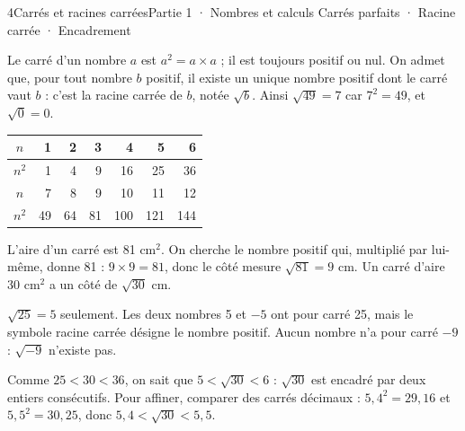 \begin{ouverture}[calcul]{4}{Carrés et racines carrées}{Partie 1 · Nombres et calculs}
{Carrés parfaits · Racine carrée · Encadrement}
\end{ouverture}
\pagestyle{otMain}\essentiel\fontsize{11}{15}\selectfont
{}\label{cours-4-1}
\begin{definition}Le carré d’un nombre $a$ est $a^2=a\times a$ ; il est toujours positif ou nul. On admet que, pour tout nombre $b$ positif, il existe un unique nombre positif dont le carré vaut $b$ : c’est la racine carrée de $b$, notée $\sqrt b$. Ainsi $\sqrt{49}=7$ car $7^2=49$, et $\sqrt0=0$.\end{definition}
\begin{center}\begin{tabular}{c|rrrrrr}\toprule
$n$ & 1 & 2 & 3 & 4 & 5 & 6\\\midrule
$n^2$ & 1 & 4 & 9 & 16 & 25 & 36\\\midrule
$n$ & 7 & 8 & 9 & 10 & 11 & 12\\\midrule
$n^2$ & 49 & 64 & 81 & 100 & 121 & 144\\\bottomrule
\end{tabular}\end{center}
\begin{exemple}L’aire d’un carré est 81 cm$^2$. On cherche le nombre positif qui, multiplié par lui-même, donne 81 : $9\times9=81$, donc le côté mesure $\sqrt{81}=9$ cm. Un carré d’aire 30 cm$^2$ a un côté de $\sqrt{30}$ cm.\end{exemple}
\begin{attention}$\sqrt{25}=5$ seulement. Les deux nombres 5 et $-5$ ont pour carré 25, mais le symbole racine carrée désigne le nombre positif. Aucun nombre n’a pour carré $-9$ : $\sqrt{-9}$ n’existe pas.\end{attention}
\clearpage
{}\label{cours-4-2}
\begin{savoirfaire}Comme $25<30<36$, on sait que $5<\sqrt{30}<6$ : $\sqrt{30}$ est encadré par deux entiers consécutifs. Pour affiner, comparer des carrés décimaux : $5{,}4^2=29{,}16$ et $5{,}5^2=30{,}25$, donc $5{,}4<\sqrt{30}<5{,}5$.\end{savoirfaire}
